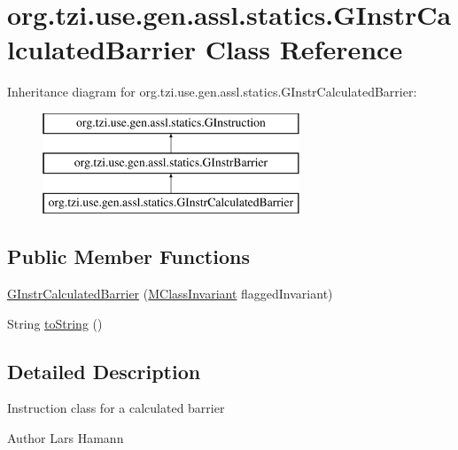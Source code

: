 \hypertarget{classorg_1_1tzi_1_1use_1_1gen_1_1assl_1_1statics_1_1_g_instr_calculated_barrier}{\section{org.\-tzi.\-use.\-gen.\-assl.\-statics.\-G\-Instr\-Calculated\-Barrier Class Reference}
\label{classorg_1_1tzi_1_1use_1_1gen_1_1assl_1_1statics_1_1_g_instr_calculated_barrier}
}
Inheritance diagram for org.\-tzi.\-use.\-gen.\-assl.\-statics.\-G\-Instr\-Calculated\-Barrier\-:\begin{figure}[H]
\begin{center}
\leavevmode
\includegraphics[height=3.000000cm]{classorg_1_1tzi_1_1use_1_1gen_1_1assl_1_1statics_1_1_g_instr_calculated_barrier}
\end{center}
\end{figure}
\subsection*{Public Member Functions}
\begin{DoxyCompactItemize}
\item 
\hyperlink{classorg_1_1tzi_1_1use_1_1gen_1_1assl_1_1statics_1_1_g_instr_calculated_barrier_a1dbe30b55d2577dc157098578f054b30}{G\-Instr\-Calculated\-Barrier} (\hyperlink{classorg_1_1tzi_1_1use_1_1uml_1_1mm_1_1_m_class_invariant}{M\-Class\-Invariant} flagged\-Invariant)
\item 
String \hyperlink{classorg_1_1tzi_1_1use_1_1gen_1_1assl_1_1statics_1_1_g_instr_calculated_barrier_a9c9e829a9751ce3374a8a757c616d32b}{to\-String} ()
\end{DoxyCompactItemize}


\subsection{Detailed Description}
Instruction class for a calculated barrier \begin{DoxyAuthor}{Author}
Lars Hamann 
\end{DoxyAuthor}


